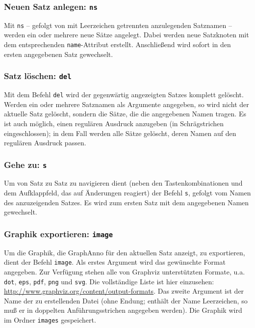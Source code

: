 \documentclass[12pt]{scrartcl}
\begin{document}
\subsubsection{Neuen Satz anlegen: \texttt{ns}}\label{befehl-ns}

Mit \texttt{ns} – gefolgt von mit Leerzeichen getrennten anzulegenden Satznamen – werden ein oder mehrere neue Sätze angelegt. Dabei werden neue Satzknoten mit dem entsprechenden \texttt{name}-Attribut erstellt. Anschließend wird sofort in den ersten angegebenen Satz gewechselt.


\subsubsection{Satz löschen: \texttt{del}}

Mit dem Befehl \texttt{del} wird der gegenwärtig angezeigten Satzes komplett gelöscht.
Werden ein oder mehrere Satznamen als Argumente angegeben, so wird nicht der aktuelle Satz gelöscht, sondern die Sätze, die die angegebenen Namen tragen.
Es ist auch möglich, einen regulären Ausdruck anzugeben (in Schrägstrichen eingeschlossen); in dem Fall werden alle Sätze gelöscht, deren Namen auf den regulären Ausdruck passen.


\subsubsection{Gehe zu: \texttt{s}}

Um von Satz zu Satz zu navigieren dient (neben den Tastenkombinationen und dem Aufklappfeld, das auf Änderungen reagiert) der Befehl \texttt{s}, gefolgt vom Namen des anzuzeigenden Satzes. Es wird zum ersten Satz mit dem angegebenen Namen gewechselt.


\subsubsection{Graphik exportieren: \texttt{image}}

Um die Graphik, die GraphAnno für den aktuellen Satz anzeigt, zu exportieren, dient der Befehl \texttt{image}. Als erstes Argument wird das gewünschte Format angegeben. Zur Verfügung stehen alle von Graphviz unterstützten Formate, u.a. \texttt{dot}, \texttt{eps}, \texttt{pdf}, \texttt{png} und \texttt{svg}. Die vollständige Liste ist hier einzusehen: \url{http://www.graphviz.org/content/output-formats}. Das zweite Argument ist der Name der zu erstellenden Datei (ohne Endung; enthält der Name Leerzeichen, so muß er in doppelten Anführungsstrichen angegeben werden). Die Graphik wird im Ordner \texttt{images} gespeichert.
\end{document}

